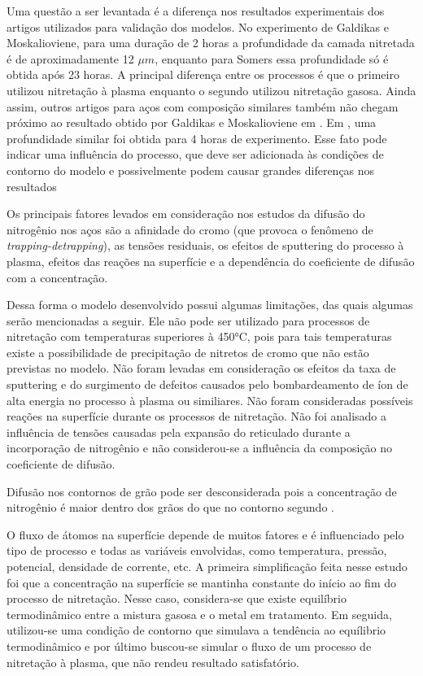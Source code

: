 Uma questão a ser levantada é a diferença nos resultados experimentais dos artigos utilizados para validação dos modelos. No experimento de Galdikas e Moskalioviene, para uma duração de 2 horas a profundidade da camada nitretada é de aproximadamente   12 $\mu m$, enquanto para Somers essa profundidade só é obtida após 23 horas. A principal diferença entre os processos é que o primeiro utilizou nitretação à plasma enquanto o segundo utilizou nitretação gasosa.  Ainda assim, outros artigos para aços com composição similares também não chegam próximo ao resultado obtido por Galdikas e Moskalioviene em \cite{moskalioviene2011modeling}. Em \cite{galdikas2011modeling}, uma profundidade similar foi obtida para 4 horas de experimento. Esse fato pode indicar uma influência do processo, que deve ser adicionada às condições de contorno do modelo e possivelmente podem causar grandes diferenças nos resultados

Os principais fatores levados em consideração nos estudos da difusão do nitrogênio nos aços são a afinidade do cromo (que provoca o fenômeno de \textit{trapping-detrapping}), as tensões residuais, os efeitos de sputtering do processo à plasma, efeitos das reações na superfície e a dependência do coeficiente de difusão com a concentração.

Dessa forma o modelo desenvolvido possui algumas limitações, das quais algumas serão mencionadas a seguir. Ele não pode ser utilizado para processos de nitretação com temperaturas superiores à 450°C, pois para tais temperaturas existe a possibilidade de precipitação de nitretos de cromo que não estão previstas no modelo. Não foram levadas em consideração os efeitos da taxa de sputtering e do surgimento de defeitos causados pelo bombardeamento de íon de alta energia no processo à plasma ou similiares. Não foram consideradas possíveis reações na superfície durante os processos de nitretação. Não foi analisado a influência de tensões causadas pela expansão do reticulado durante a incorporação de nitrogênio e não considerou-se a influência da composição no coeficiente de difusão.

Difusão nos contornos de grão pode ser desconsiderada pois a concentração de nitrogênio é maior dentro dos grãos do que no contorno segundo \cite{parascandola2000nitrogen}.

O fluxo de átomos na superfície depende de muitos fatores e é influenciado pelo tipo de processo e todas as variáveis envolvidas, como temperatura, pressão, potencial, densidade de corrente, etc.
A primeira simplificação feita nesse estudo foi que a concentração na superfície se mantinha constante do início ao fim do processo de nitretação. Nesse caso, considera-se que existe equilíbrio termodinâmico entre a  mistura gasosa e o metal em tratamento. Em seguida, utilizou-se uma condição de contorno que simulava a  tendência ao equílibrio termodinâmico e por último buscou-se simular o fluxo de um processo de nitretação à plasma, que não rendeu resultado satisfatório.
 
